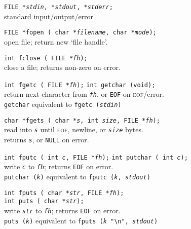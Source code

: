 \documentclass[8pt]{article}
\newcommand{\Cc}[1]{\texttt{#1}}
\newcommand{\ty}[1]{\textcolor{blue!80}{\texttt{#1}}} %
\newcommand{\kv}[1]{\textcolor{red!40!black}{\texttt{#1}}} %
\newcommand{\fn}[1]{\texttt{#1}} %
\newcommand{\var}[1]{\texttt{\textit{#1}}} %
\newcommand{\opt}[1]{\textrm{\textit{#1}}} %
\newcommand{\htab}{\hspace*{2em}} %
\newcommand{\Cx}{\textbackslash} %
\begin{document}
\begin{multicols}{3}
\Cc{\ty{FILE *}\var{stdin}, \ty{*}\var{stdout}, \ty{*}\var{stderr};}\\
\htab standard input/output/error

\Cc{\ty{FILE *}\fn{fopen}\,(%
    \ty{char *}\var{filename},
    \ty{char *}\var{mode});}\\
\htab open file; return new `file handle'.

\Cc{\ty{int} \fn{fclose}\,(%
    \ty{FILE *}\var{fh});}\\
\htab close a file; returns non-zero on error.

\Cc{\ty{int} \fn{fgetc}\,(%
    \ty{FILE *}\var{fh});}\hfill
\Cc{\ty{int} \fn{getchar}\,(\ty{void});}\\
\htab return next character from \var{fh}, or \kv{EOF} on \textsc{eof}/error. \\
\htab \fn{getchar} equivalent to \Cc{\fn{fgetc}\,(\var{stdin})}

\Cc{\ty{char *}\fn{fgets}\,(%
    \ty{char *}\var{s},
    \ty{int} \var{size},
    \ty{FILE *}\var{fh});}\\
\htab read into \var{s} until \textsc{eof}, newline, or \var{size} bytes. \\
\htab returns \var{s}, or \kv{NULL} on error.

\Cc{\ty{int} \fn{fputc}\,(%
    \ty{int} \var{c},
    \ty{FILE *}\var{fh});}\hfill
\Cc{\ty{int} \fn{putchar}\,(%
    \ty{int} \var{c});}\\
\htab write \var{c} to \var{fh}; returns \kv{EOF} on error. \\
\htab \Cc{\fn{putchar}\,(\opt{k})} equivalent to \Cc{\fn{fputc}\,(\opt{k}, \var{stdout})}

\Cc{\ty{int} \fn{fputs}\,(%
    \ty{char *}\var{str},
    \ty{FILE *}\var{fh});}\\
\Cc{\ty{int} \fn{puts}\,(%
    \ty{char *}\var{str});}\\
\htab write \var{str} to \var{fh}; returns \kv{EOF} on error. \\
\htab \Cc{\fn{puts}\,(\opt{k})} equivalent to \Cc{\fn{fputs}\,(\opt{k} "\Cx n", \var{stdout})}


\end{multicols}
\end{document}
